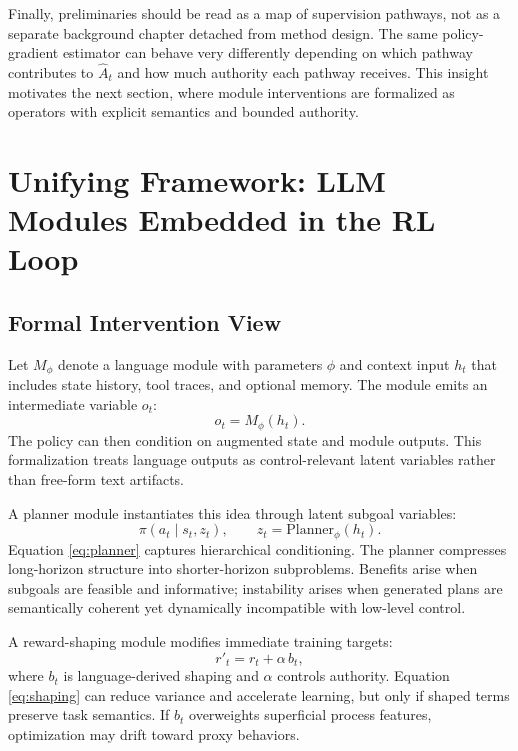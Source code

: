 ﻿\documentclass[conference]{IEEEtran}
\begin{document}
Finally, preliminaries should be read as a map of supervision pathways, not as a separate background chapter detached from method design. The same policy-gradient estimator can behave very differently depending on which pathway contributes to $\hat{A}_t$ and how much authority each pathway receives. This insight motivates the next section, where module interventions are formalized as operators with explicit semantics and bounded authority.

\section{Unifying Framework: LLM Modules Embedded in the RL Loop}
\subsection{Formal Intervention View}
Let $M_\phi$ denote a language module with parameters $\phi$ and context input $h_t$ that includes state history, tool traces, and optional memory. The module emits an intermediate variable $o_t$:
\begin{equation}
o_t=M_\phi(h_t).
\end{equation}
The policy can then condition on augmented state and module outputs. This formalization treats language outputs as control-relevant latent variables rather than free-form text artifacts.

A planner module instantiates this idea through latent subgoal variables:
\begin{equation}
\pi(a_t\mid s_t,z_t),\qquad z_t=\mathrm{Planner}_{\phi}(h_t).
\label{eq:planner}
\end{equation}
Equation \eqref{eq:planner} captures hierarchical conditioning. The planner compresses long-horizon structure into shorter-horizon subproblems. Benefits arise when subgoals are feasible and informative; instability arises when generated plans are semantically coherent yet dynamically incompatible with low-level control.

A reward-shaping module modifies immediate training targets:
\begin{equation}
r'_t=r_t+\alpha\,b_t,
\label{eq:shaping}
\end{equation}
where $b_t$ is language-derived shaping and $\alpha$ controls authority. Equation \eqref{eq:shaping} can reduce variance and accelerate learning, but only if shaped terms preserve task semantics. If $b_t$ overweights superficial process features, optimization may drift toward proxy behaviors.
\end{document}
